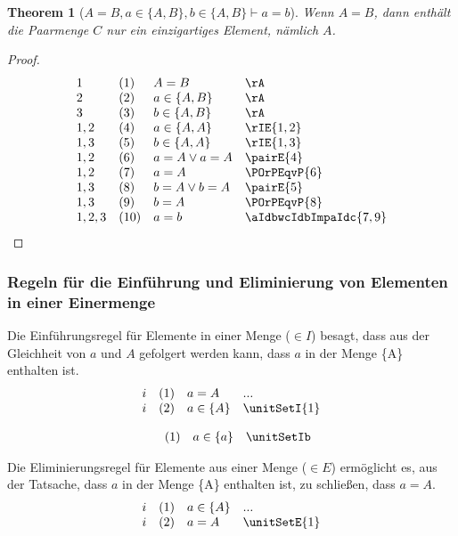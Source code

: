 \documentclass{book}
\theoremstyle{plain}
\newtheorem{theorem}{Theorem}
\theoremstyle{remark}
\theoremstyle{definition}
\begin{document}
\label{AEqualsBwaInLbAwBRbwbInLbAwBRbImpaEqualsb}
\begin{theorem}[\(A = B, a\in \{A,B\}, b\in \{A,B\}\vdash a=b\)]
	Wenn \( A = B \), dann enthält die Paarmenge \( C \) nur ein einzigartiges Element, nämlich \( A \).
\end{theorem}
\begin{proof}
	\[
	\begin{array}{llll}
		1 & (1) & A = B & \rA \\
		2 & (2) & a\in \{A,B\} & \rA \\
		3 & (3) & b\in \{A,B\} & \rA \\
		1,2 & (4) & a\in \{A,A\} & \rIE{1,2}\\
		1,3 & (5) & b\in \{A,A\} & \rIE{1,3}\\
		1,2 & (6) & a=A\lor a=A & \pairE{4}\\
		1,2 & (7) & a=A & \POrPEqvP{6}\\
		1,3 & (8) & b=A\lor b=A & \pairE{5}\\
		1,3 & (9) & b=A & \POrPEqvP{8}\\			
		1,2,3 & (10) & a=b & \aIdbwcIdbImpaIdc{7,9}\\			
	\end{array}
	\]
\end{proof}

\subsubsection{Regeln für die Einführung und Eliminierung von Elementen in einer Einermenge}
\label{rule:unitSetI} \label{rule:unitSetE} \label{rule:unitSetIb}

Die Einführungsregel für Elemente in einer Menge (\( \in I \)) besagt, dass aus der Gleichheit von \( a \) und \( A \) gefolgert werden kann, dass \( a \) in der Menge \{A\} enthalten ist.
\[
\begin{array}{llll}
	i & (1) & a = A & ... \\
	i & (2) & a \in \{A\} & \unitSetI{1} \\
\end{array}
\]

\[
\begin{array}{llll}
	& (1) & a \in \{a\} & \unitSetIb \\
\end{array}
\]

Die Eliminierungsregel für Elemente aus einer Menge (\( \in E \)) ermöglicht es, aus der Tatsache, dass \( a \) in der Menge \{A\} enthalten ist, zu schließen, dass \( a = A \).
\[
\begin{array}{llll}
	i & (1) & a \in \{A\} & ... \\
	i & (2) & a = A & \unitSetE{1} \\
\end{array}
\]
\end{document}
